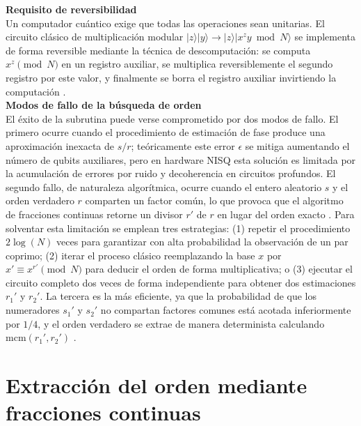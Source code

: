 \documentclass[12pt, spanish]{book}
\begin{document}
\textbf{Requisito de reversibilidad}\\ 

Un computador cuántico exige que todas las operaciones sean unitarias. El circuito clásico de multiplicación modular $|z\rangle|y\rangle \to |z\rangle|x^z y \bmod N\rangle$ se implementa de forma reversible mediante la técnica de descomputación: se computa $x^z \pmod{N}$ en un registro auxiliar, se multiplica reversiblemente el segundo registro por este valor, y finalmente se borra el registro auxiliar invirtiendo la computación \cite{Nielsen2024}.\\

\textbf{Modos de fallo de la búsqueda de orden}\\

El éxito de la subrutina puede verse comprometido por dos modos de fallo. El primero ocurre cuando el procedimiento de estimación de fase produce una aproximación inexacta de $s/r$; teóricamente este error $\epsilon$ se mitiga aumentando el número de qubits auxiliares, pero en hardware NISQ esta solución es limitada por la acumulación de errores por ruido y decoherencia en circuitos profundos. El segundo fallo, de naturaleza algorítmica, ocurre cuando el entero aleatorio $s$ y el orden verdadero $r$ comparten un factor común, lo que provoca que el algoritmo de fracciones continuas retorne un divisor $r'$ de $r$ en lugar del orden exacto \cite{Nielsen2024}. Para solventar esta limitación se emplean tres estrategias: (1) repetir el procedimiento $2\log(N)$ veces para garantizar con alta probabilidad la observación de un par coprimo; (2) iterar el proceso clásico reemplazando la base $x$ por $x' \equiv x^{r'} \pmod N$ para deducir el orden de forma multiplicativa; o (3) ejecutar el circuito completo dos veces de forma independiente para obtener dos estimaciones $r_1'$ y $r_2'$. La tercera es la más eficiente, ya que la probabilidad de que los numeradores $s_1'$ y $s_2'$ no compartan factores comunes está acotada inferiormente por $1/4$, y el orden verdadero se extrae de manera determinista calculando $\mathrm{mcm}(r_1', r_2')$ \cite{Nielsen2024}.\\

\section{Extracción del orden mediante fracciones continuas}
\label{app:fracciones-continuas-teoria}
\end{document}
